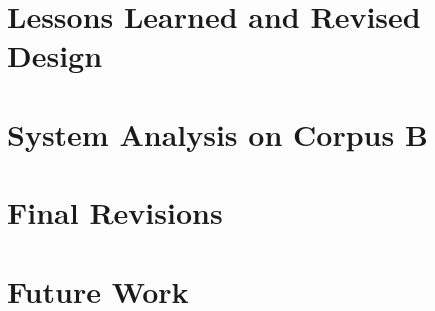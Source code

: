 \documentclass[11pt,letterpaper]{article}
\begin{document}
\section{Lessons Learned and Revised Design}

\section{System Analysis on Corpus B}

\section{Final Revisions}

\section{Future Work}








\label{lastpage}
\end{document}
